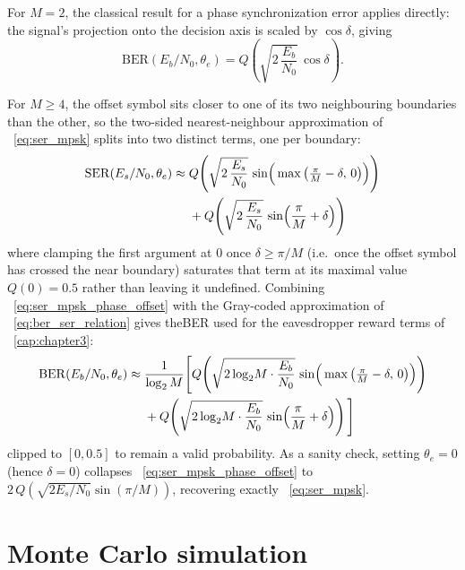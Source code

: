 For $M = 2$, the classical result for a phase synchronization error applies directly: the signal's projection onto the decision axis is scaled by $\cos\delta$, giving
\begin{equation}
    \mathrm{BER}(E_b/N_0, \theta_e) = Q\!\left(\sqrt{2\,\frac{E_b}{N_0}}\,\cos\delta\right).
    \label{eq:ber_bpsk_phase_offset}
\end{equation}

For $M \geq 4$, the offset symbol sits closer to one of its two neighbouring boundaries than the other, so the two-sided nearest-neighbour approximation of \equationname~\eqref{eq:ser_mpsk} splits into two distinct terms, one per boundary:
\begin{align}
    \mathrm{SER}(E_s/N_0, \theta_e) \approx{} & Q\!\left(\sqrt{2\,\frac{E_s}{N_0}}\,\sin\!\Big(\max\big(\tfrac{\pi}{M} - \delta,\, 0\big)\Big)\right) \notag \\
    & {}+ Q\!\left(\sqrt{2\,\frac{E_s}{N_0}}\,\sin\!\left(\frac{\pi}{M} + \delta\right)\right)
    \label{eq:ser_mpsk_phase_offset}
\end{align}
where clamping the first argument at $0$ once $\delta \geq \pi/M$ (i.e.\ once the offset symbol has crossed the near boundary) saturates that term at its maximal value $Q(0) = 0.5$ rather than leaving it undefined. Combining \equationname~\eqref{eq:ser_mpsk_phase_offset} with the Gray-coded approximation of \equationname~\eqref{eq:ber_ser_relation} gives the\gls{BER} used for the eavesdropper reward terms of \chaptername~\ref{cap:chapter3}:
\begin{align}
    \mathrm{BER}(E_b/N_0, \theta_e) \approx{} & \frac{1}{\log_2 M}\Bigg[Q\!\left(\sqrt{2\log_2\!M\cdot\frac{E_b}{N_0}}\,\sin\!\Big(\max\big(\tfrac{\pi}{M}-\delta,\,0\big)\Big)\right) \notag \\
    & {}+ Q\!\left(\sqrt{2\log_2\!M\cdot\frac{E_b}{N_0}}\,\sin\!\left(\frac{\pi}{M}+\delta\right)\right)\Bigg]
    \label{eq:ber_mpsk_phase_offset}
\end{align}
clipped to $[0, 0.5]$ to remain a valid probability. As a sanity check, setting $\theta_e = 0$ (hence $\delta = 0$) collapses \equationname~\eqref{eq:ser_mpsk_phase_offset} to $2\,Q\!\left(\sqrt{2E_s/N_0}\sin(\pi/M)\right)$, recovering exactly \equationname~\eqref{eq:ser_mpsk}.

\section{Monte Carlo simulation}

